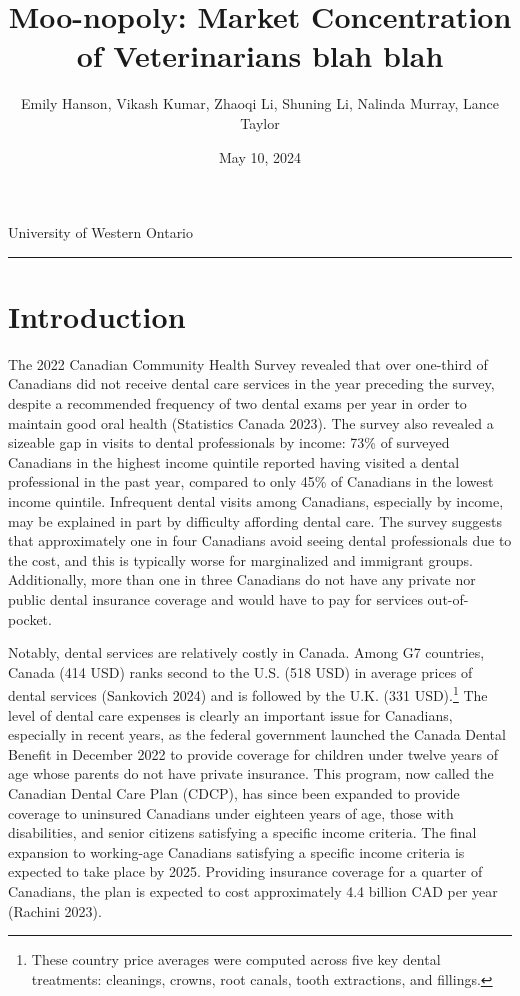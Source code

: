 \documentclass[a4paper,11pt]{article}
\title{\vspace{-1.2cm} Moo-nopoly: Market Concentration of Veterinarians blah blah}
\author{Emily Hanson, Vikash Kumar, Zhaoqi Li, Shuning Li, Nalinda Murray, Lance Taylor }
\date{May 10, 2024}
\begin{document}
\maketitle \vspace{-.4 in}
\begin{center}
University of Western Ontario
\rule{\textwidth}{1pt} 
\end{center}




\begin{abstract}
\lipsum[5]
\end{abstract}

\section{Introduction}
The 2022 Canadian Community Health Survey revealed that over one-third of Canadians did not receive dental care services in the year preceding the survey, despite a recommended frequency of two dental exams per year in order to maintain good oral health (Statistics Canada 2023). The survey also revealed a sizeable gap in visits to dental professionals by income: 73\% of surveyed Canadians in the highest income quintile reported having visited a dental professional in the past year, compared to only 45\% of Canadians in the lowest income quintile. Infrequent dental visits among Canadians, especially by income, may be explained in part by difficulty affording dental care. The survey suggests that approximately one in four Canadians avoid seeing dental professionals due to the cost, and this is typically worse for marginalized and immigrant groups. Additionally, more than one in three Canadians do not have any private nor public dental insurance coverage and would have to pay for services out-of-pocket.

Notably, dental services are relatively costly in Canada. Among G7 countries, Canada (414 USD) ranks second to the U.S. (518 USD) in average prices of dental services (Sankovich 2024) and is followed by the U.K. (331 USD).\footnote{These country price averages were computed across five key dental treatments: cleanings, crowns, root canals, tooth extractions, and fillings.} The level of dental care expenses is clearly an important issue for Canadians, especially in recent years, as the federal government launched the Canada Dental Benefit in December 2022 to provide coverage for children under twelve years of age whose parents do not have private insurance. This program, now called the Canadian Dental Care Plan (CDCP), has since been expanded to provide coverage to uninsured Canadians under eighteen years of age, those with disabilities, and senior citizens satisfying a specific income criteria. The final expansion to working-age Canadians satisfying a specific income criteria is expected to take place by 2025. Providing insurance coverage for a quarter of Canadians, the plan is expected to cost approximately 4.4 billion CAD per year (Rachini 2023).
\end{document}
